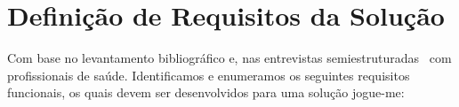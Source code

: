%
%
%
%

\section{Definição de Requisitos da Solução}\label{section:requisitos_solucao}
Com base no levantamento bibliográfico e, nas entrevistas semiestruturadas~\cite{FLI04} com profissionais de saúde. Identificamos e enumeramos os seguintes requisitos funcionais, os quais devem ser desenvolvidos para uma solução \ac{jogue-me}:

